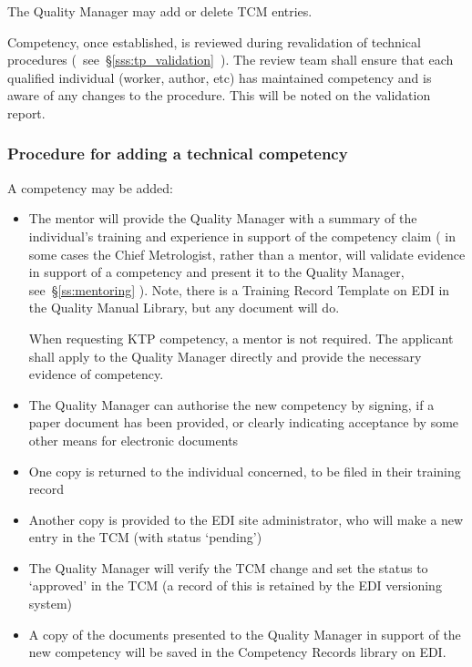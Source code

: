 The Quality Manager may add or delete TCM entries. 

Competency, once established, is reviewed during revalidation of technical procedures (~see~\S\ref{sss:tp_validation}~).  The review team shall ensure that each qualified individual (worker, author, etc) has maintained competency and is aware of any changes to the procedure. This will be noted on the validation report. 

\subsubsection{Procedure for adding a technical competency}
\label{sss:tcm_procedure}
A competency may be added:
\begin{itemize}
\item The mentor will provide the Quality Manager with a summary of the individual's training and experience in support of the competency claim ( in some cases the Chief Metrologist, rather than a mentor, will validate evidence in support of a competency and present it to the Quality Manager, see~\S\ref{ss:mentoring} ). Note, there is a Training Record Template on EDI in the Quality Manual Library, but any document will do.

When requesting KTP competency, a mentor is not required. The applicant shall apply to the Quality Manager directly and provide the necessary evidence of competency.

\item The Quality Manager can authorise the new competency by signing, if a paper document has been provided, or clearly indicating acceptance by some other means for electronic documents 

\item One copy is returned to the individual concerned, to be filed in their training record

\item Another copy is provided to the EDI site administrator, who will make a new entry in the TCM (with status ‘pending') 

\item The Quality Manager will verify the TCM change and set the status to ‘approved' in the TCM (a record of this is retained by the EDI versioning system)

\item A copy of the documents presented to the Quality Manager in support of the new competency will be saved in the Competency Records library on EDI.
\end{itemize}

